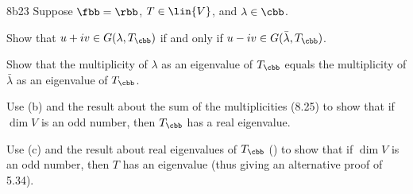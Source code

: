 \begin{exercise}{8b23}
    Suppose $\fbb = \rbb$, $T \in \lin{V}$, and $\lambda \in \cbb$.
    \begin{subexercises}
        \item Show that $u + iv \in G(\lambda, T_{\cbb})$ if and only if $u - iv \in G(\bar{\lambda}, T_{\cbb})$.
        \item Show that the multiplicity of $\lambda$ as an eigenvalue of $T_{\cbb}$ equals the multiplicity of $\bar{\lambda}$ as an eigenvalue of $T_{\cbb}$.
        \item Use (b) and the result about the sum of the multiplicities (8.25) to show that if $\dim V$ is an odd number, then $T_{\cbb}$ has a real eigenvalue.
        \item Use (c) and the result about real eigenvalues of $T_{\cbb}$ () to show that if $\dim V$ is an odd number, then $T$ has an eigenvalue (thus giving an alternative proof of 5.34).
    \end{subexercises}

\end{exercise}


